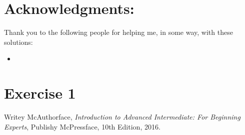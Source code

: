 \documentclass[twoside, titlepage]{amsart}
\makeatletter
\theoremstyle{plain} %
\theoremstyle{definition}
\theoremstyle{remark}
\theoremstyle{notation}
\renewenvironment{proof}[1][\proofname]{\par
	\pushQED{\qed}%
	\normalfont \topsep6\p@\@plus6\p@\relax
	\trivlist
	\item\relax
	{\itshape
		#1\@addpunct{.}}\hspace\labelsep\ignorespaces
}{%
\popQED\endtrivlist\@endpefalse
}
\makeatother
\begin{document}
	\section*{Acknowledgments:}
	Thank you to the following people for helping me, in some way, with these solutions:
	\begin{itemize}
		\item 
	\end{itemize}
	
	\clearpage
	
	\section*{Exercise 1}
	
		
	
	\begin{proof}
		
		
		
	\end{proof}
	
	\clearpage
	
	\begin{thebibliography}{"McAuthorface16"}
			Writey McAuthorface,
			\emph{Introduction to Advanced Intermediate: For Beginning Experts},
			Publishy McPressface,
			10th Edition,
			2016.
	\end{thebibliography}
	
\end{document}
